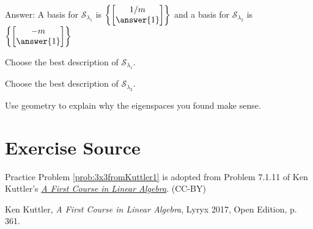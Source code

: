 \documentclass{ximera}
\begin{document}
\begin{problem}
\begin{problem}
Answer:  A basis for $\mathcal{S}_{\lambda_1}$ is $\left\{\begin{bmatrix}1/m\\\answer{1}\end{bmatrix}\right\}$
and a basis for $\mathcal{S}_{\lambda_2}$ is $\left\{\begin{bmatrix}-m\\\answer{1}\end{bmatrix}\right\}$

Choose the best description of $\mathcal{S}_{\lambda_1}$.
\begin{multipleChoice}
\end{multipleChoice}

Choose the best description of $\mathcal{S}_{\lambda_2}$.
\begin{multipleChoice}
\end{multipleChoice}

Use geometry to explain why the eigenspaces you found make sense.

\end{problem}
\end{problem}

\section*{Exercise Source}
Practice Problem \ref{prob:3x3fromKuttler1} is adopted from Problem 7.1.11 of Ken Kuttler's \href{https://open.umn.edu/opentextbooks/textbooks/a-first-course-in-linear-algebra-2017}{\it A First Course in Linear Algebra}. (CC-BY)

Ken Kuttler, {\it  A First Course in Linear Algebra}, Lyryx 2017, Open Edition, p. 361.
\end{document}
